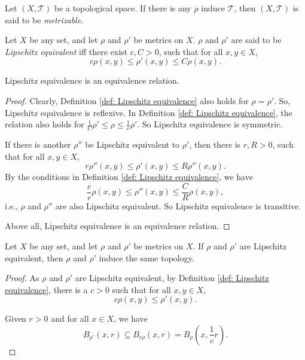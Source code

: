 \begin{definition}
	\label{def: metrizable spaces}
	Let $(X, \mathcal T)$ be a topological space. If there is any $\rho$ induce $\mathcal T$, then $(X, \mathcal T)$ is said to be \textit{metrizable}.
\end{definition}


\begin{definition}
	\label{def: Lipschitz equivalence}
	Let $X$ be any set, and let $\rho$ and $\rho'$ be metrics on $X$. $\rho$ and $\rho'$ are said to be \textit{Lipschitz equivalent} iff there exist $c, C > 0$, such that for all $x,y \in X$,
	$$
	c \rho(x,y) \le \rho'(x,y) \le C \rho(x,y).
	$$
\end{definition}


\begin{proposition}
	\label{prop: Lipschitz equivalence is a equivalence relation}
	Lipschitz equivalence is an equivalence relation.
	
	\begin{proof}
		Clearly, Definition \ref{def: Lipschitz equivalence} also holds for $\rho = \rho'$. So, Lipschitz equivalence is reflexive. In Definition \ref{def: Lipschitz equivalence}, the relation also holds for $\frac{1}{C} \rho' \le \rho \le \frac{1}{c} \rho'$. So Lipschitz equivalence is symmetric.
		
		If there is another $\rho''$ be Lipschitz equivalent to $\rho'$, then there is $r, R > 0$, such that for all $x,y \in X$,
		$$
		r\rho''(x,y) \le \rho'(x,y) \le R\rho''(x,y).
		$$
		By the conditions in Definition \ref{def: Lipschitz equivalence}, we have
		$$
		\frac{c}{r} \rho(x,y) \le \rho''(x,y) \le  \frac{C}{R} \rho(x,y),
		$$
		i.e., $\rho$ and $\rho''$ are also Lipschitz equivalent. So Lipschitz equivalence is transitive.
		
		Above all, Lipschitz equivalence is an equivalence relation.
	\end{proof}
\end{proposition}


\begin{proposition}
	\label{prop: Lipschitz equivalent metrics induces the same topology}
	Let $X$ be any set, and let $\rho$ and $\rho'$ be metrics on $X$. If $\rho$ and $\rho'$ are Lipschitz equivalent, then $\rho$ and $\rho'$ induce the same topology.
	
	\begin{proof}
		As $\rho$ and $\rho'$ are Lipschitz equivalent, by Definition \ref{def: Lipschitz equivalence}, there is a $c > 0$ such that for all $x,y \in X$,
		$$
		c \rho(x,y) \le \rho'(x,y).
		$$
		
		Given $r > 0$ and for all $x \in X$, we have
		$$
		B_{\rho'}(x, r) \subseteq B_{c \rho}(x, r) = B_\rho \left( x, \frac{1}{c} r \right).
		$$
		
	\end{proof}
\end{proposition}


